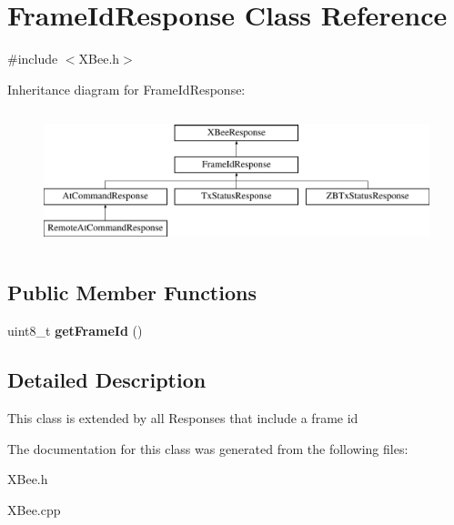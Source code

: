 \hypertarget{classFrameIdResponse}{\section{\-Frame\-Id\-Response \-Class \-Reference}
\label{classFrameIdResponse}
}


{\ttfamily \#include $<$\-X\-Bee.\-h$>$}

\-Inheritance diagram for \-Frame\-Id\-Response\-:\begin{figure}[H]
\begin{center}
\leavevmode
\includegraphics[height=4.000000cm]{classFrameIdResponse}
\end{center}
\end{figure}
\subsection*{\-Public \-Member \-Functions}
\begin{DoxyCompactItemize}
\item 
\hypertarget{classFrameIdResponse_a65a801fb25e995e3f1b048934b9cf803}{uint8\-\_\-t {\bfseries get\-Frame\-Id} ()}\label{classFrameIdResponse_a65a801fb25e995e3f1b048934b9cf803}

\end{DoxyCompactItemize}


\subsection{\-Detailed \-Description}
\-This class is extended by all \-Responses that include a frame id 

\-The documentation for this class was generated from the following files\-:\begin{DoxyCompactItemize}
\item 
\-X\-Bee.\-h\item 
\-X\-Bee.\-cpp\end{DoxyCompactItemize}
